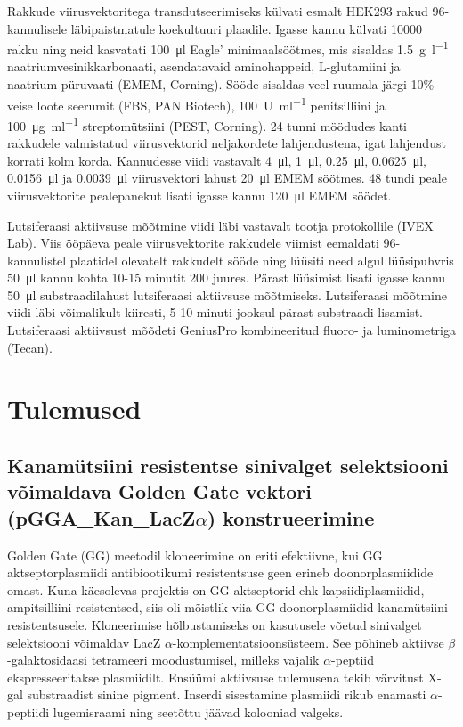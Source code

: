 \documentclass{trkut}%
\begin{document}
Rakkude viirusvektoritega transdutseerimiseks külvati esmalt HEK293 rakud 96-kannulisele läbipaistmatule koekultuuri plaadile. Igasse kannu külvati 10000 rakku ning neid kasvatati \SI{100}{\micro\litre} Eagle’ minimaalsöötmes, mis sisaldas \SI{1,5}{\gram\per\litre} naatriumvesinikkarbonaati, asendatavaid aminohappeid, L-glutamiini ja naatrium-püruvaati (EMEM, Corning). Sööde sisaldas veel ruumala järgi 10\% veise loote seerumit (FBS, PAN Biotech), \SI{100}{U\per\milli\litre} penitsilliini ja \SI{100}{\micro\gram\per\milli\litre} streptomütsiini (PEST, Corning). 24 tunni möödudes kanti rakkudele valmistatud viirusvektorid neljakordete lahjendustena, igat lahjendust korrati kolm korda. Kannudesse viidi vastavalt \SI{4}{\micro\litre}, \SI{1}{\micro\litre}, \SI{0,25}{\micro\litre}, \SI{0,0625}{\micro\litre}, \SI{0,0156}{\micro\litre} ja \SI{0,0039}{\micro\litre} viirusvektori lahust \SI{20}{\micro\litre} EMEM söötmes. 48 tundi peale viirusvektorite pealepanekut lisati igasse kannu \SI{120}{\micro\litre}
EMEM söödet. 

Lutsiferaasi aktiivsuse mõõtmine viidi läbi vastavalt tootja protokollile (IVEX Lab). Viis ööpäeva peale viirusvektorite rakkudele viimist eemaldati 96-kannulistel plaatidel olevatelt rakkudelt sööde ning lüüsiti need algul lüüsipuhvris \SI{50}{\micro\litre} kannu kohta 10-15 minutit \SI{200}{\rpm} juures. Pärast lüüsimist lisati igasse kannu \SI{50}{\micro\litre} substraadilahust lutsiferaasi aktiivsuse mõõtmiseks. Lutsiferaasi mõõtmine viidi läbi võimalikult kiiresti, 5-10 minuti jooksul pärast substraadi lisamist. Lutsiferaasi aktiivsust mõõdeti GeniusPro kombineeritud fluoro- ja luminometriga (Tecan).

\section{Tulemused}

\subsection{Kanamütsiini resistentse sinivalget selektsiooni võimaldava Golden Gate vektori (pGGA\_Kan\_LacZ$\alpha$) konstrueerimine}

Golden Gate (GG) meetodil kloneerimine on eriti efektiivne, kui GG aktseptorplasmiidi antibiootikumi resistentsuse geen erineb doonorplasmiidide omast. Kuna käesolevas projektis on GG aktseptorid ehk kapsiidiplasmiidid, ampitsilliini resistentsed, siis oli mõistlik viia GG doonorplasmiidid kanamütsiini resistentsusele. Kloneerimise hõlbustamiseks on kasutusele võetud sinivalget selektsiooni võimaldav LacZ $\alpha$-komplementatsioonsüsteem. See põhineb aktiivse $\beta$-galaktosidaasi tetrameeri moodustumisel, milleks vajalik $\alpha$-peptiid ekspresseeritakse plasmiidilt. Ensüümi aktiivsuse tulemusena tekib värvitust X-gal substraadist sinine pigment. Inserdi sisestamine plasmiidi rikub enamasti $\alpha$-peptiidi lugemisraami ning seetõttu jäävad kolooniad valgeks. \parencite{ullman}
\end{document}
